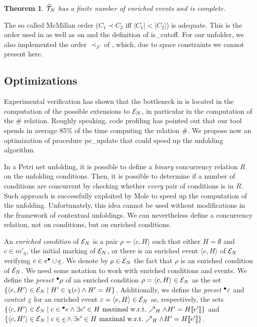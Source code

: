\documentclass[11pt,a4paper]{article}
\newtheorem{theorem}{Theorem}
\newcommand{\confl}{\ensuremath{\mathord{\#}}}
\newcommand{\peupdate}{\mbox{\sf pe\_update}}
\newcommand{\iscutoff}{\mbox{\sf is\_cutoff}}
\begin{document}
\begin{theorem}
\label{thm:atrunc.has}
$\widehat{\mathcal{T}}_{N}$ has a finite number of enriched events and is complete.
\end{theorem}

The so called McMillan order ($C_1 \prec C_2$ iff $|C_1| < |C_2|$) is adequate.
This is the order used in  as well as on
 and the definition of \iscutoff{}.  For our
unfolder, we also implemented the order $\prec_F$ of , which, due
to space constraints we cannot present here.

\subsection{Optimizations}
\label{sec:optimizations}

Experimental verification has shown that the bottleneck in
 is located in the computation of the possible
extensions to $\mathcal{E}_{N}$, in particular in the computation of the $\confl$
relation.  Roughly speaking, code profiling has pointed out that our tool
spends in average 85\% of the time computing the relation $\confl$.  We propose
now an optimization of procedure \peupdate{} that could speed up the unfolding
algorithm.

In a Petri net unfolding, it is possible to define a \emph{binary} concurrency
relation $R$ on the unfolding conditions.  Then, it is possible to determine if
a number of conditions are concurrent by checking whether \emph{every} pair of
conditions is in $R$.  Such approach is successfully exploited by Mole to speed
up the computation of the unfolding.  Unfortunately, this idea cannot be used
without modifications in the framework of contextual unfoldings.  We can
nevertheless define a concurrency relation, not on conditions, but on enriched
conditions.

An \emph{enriched condition} of $\mathcal{E}_{N}$ is a pair $\rho = \langle c, H
\rangle$ such that either $H = \emptyset$ and $c \in m'_0$, the initial marking
of $\mathcal{E}_{N}$, or there is an enriched event $\langle e, H \rangle$ of $\mathcal{E}_{N}$
verifying $c \in e^\bullet \cup \underline{e}$.  We denote by $\rho \in \mathcal{E}_{N}$ the
fact that $\rho$ is an enriched condition of $\mathcal{E}_{N}$.  We need some notation
to work with enriched conditions and events.  We define the \emph{preset} ${}^\bullet\rho$ of an enriched condition $\rho = \langle c, H \rangle \in \mathcal{E}_{N}$ as the
set $\{\langle e, H' \rangle \in \mathcal{E}_{N} \mid H' \in \chi (e) \land H' = H\}$.
Additionally, we define the \emph{preset} ${}^\bullet\varepsilon$ and \emph{context}
$\underline{\varepsilon}$ for an enriched event $\varepsilon = \langle e, H \rangle
\in \mathcal{E}_{N}$ as, respectively, the sets $\{\langle c, H' \rangle \in \mathcal{E}_{N} \mid
c \in {}^\bullet e \land \exists e' \in H \mbox{ maximal w.r.t.} \nearrow_H \land H'
= H [\![ e']\!]\}$ and $\{\langle c, H' \rangle \in \mathcal{E}_{N} \mid c \in \underline{e}
\land \exists e' \in H \mbox{ maximal w.r.t.} \nearrow_H \land H' = H
[\![ e']\!]\}$.
\end{document}
